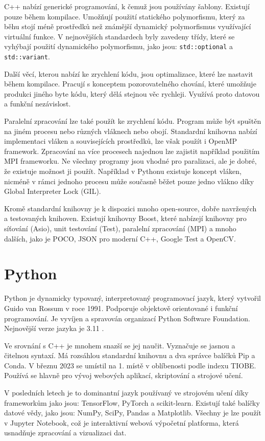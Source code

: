 C++ nabízí generické programování, k čemuž jsou používány šablony.
Existují pouze během kompilace.
Umožňují použití statického polymorfismu, který za běhu stojí méně prostředků než známější dynamický polymorfismus využívající virtuální funkce.
V nejnovějších standardech byly zavedeny třídy, které se vyhýbají použití dynamického polymorfismu, jako jsou: \texttt{std::optional} a \texttt{std::variant}.

Další věcí, kterou nabízí ke zrychlení kódu, jsou optimalizace, které lze nastavit během kompilace.
Pracují s konceptem pozorovatelného chování, které umožňuje produkci jiného byte kódu, který dělá stejnou věc rychleji.
Využívá proto datovou a funkční nezávislost.

Paralelní zpracování lze také použít ke zrychlení kódu.
Program může být spuštěn na jiném procesu nebo různých vláknech nebo obojí.
Standardní knihovna nabízí implementaci vláken a souvisejících prostředků, lze však použít i OpenMP framework.
Zpracování na více procesech najednou lze zajistit například použitím MPI frameworku.
Ne všechny programy jsou vhodné pro paralizaci, ale je dobré, že existuje možnost ji použít.
Například v Pythonu existuje koncept vláken, nicméně v rámci jednoho procesu může současně běžet pouze jedno vlákno díky Global Interpreter Lock (GIL).

Kromě standardní knihovny je k dispozici mnoho open-source, dobře navržených a testovaných knihoven.
Existují knihovny Boost, které nabízejí knihovny pro síťování (Asio), unit testování (Test), paralelní zpracování (MPI) a mnoho dalších, jako je POCO, JSON pro moderní C++, Google Test a OpenCV.

\section{Python}
Python je dynamicky typovaný, interpretovaný programovací jazyk, který vytvořil Guido van Rossum v roce 1991.
Podporuje objektově orientované i funkční programování.
Je vyvíjen a spravován organizací Python Software Foundation.
Nejnovější verze jazyka je 3.11 \cite{python}.

Ve srovnání s C++ je mnohem snazší se jej naučit.
Vyznačuje se jasnou a čitelnou syntaxí.
Má rozsáhlou standardní knihovnu a dva správce balíčků Pip a Conda.
V březnu 2023 se umístil na 1. místě v oblíbenosti podle indexu TIOBE.
Používá se hlavně pro vývoj webových aplikací, skriptování a strojové učení.

V posledních letech je to dominantní jazyk používaný ve strojovém učení díky frameworkům jako jsou: TensorFlow, PyTorch a scikit-learn.
Existují také balíčky datové vědy, jako jsou: NumPy, SciPy, Pandas a Matplotlib.
Všechny je lze použít v Jupyter Notebook, což je interaktivní webová výpočetní platforma, která usnadňuje zpracování a vizualizaci dat.

